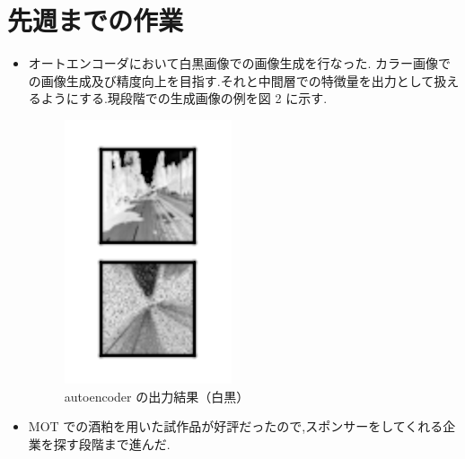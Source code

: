 \section{先週までの作業}
\begin{itemize}
          \item オートエンコーダにおいて白黒画像での画像生成を行なった. カラー画像での画像生成及び精度向上を目指す.それと中間層での特徴量を出力として扱えるようにする.現段階での生成画像の例を図 2 に示す.
\begin{figure}[hb]
\begin{center}
\includegraphics[scale=1.8]{autoencoder_1.png}
\caption{autoencoder の出力結果（白黒）}
\end{center}
\end{figure}
          \item MOT での酒粕を用いた試作品が好評だったので,スポンサーをしてくれる企業を探す段階まで進んだ.
\end{itemize}


